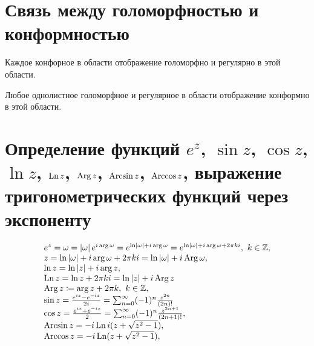 \section{Связь между голоморфностью и конформностью}

\begin{note}
	Каждое конфорное в области отображение голоморфно и регулярно в этой области.

	Любое однолистное голоморфное и регулярное в области отображение конформно в этой области.
\end{note}

\section{Определение функций $e^z$, $\sin z$, $\cos z$, $\ln z$, $\operatorname{Ln} z$, $\operatorname{Arg} z$, $\operatorname{Arcsin} z$, $\operatorname{Arccos} z$, выражение тригонометрических функций через экспоненту}

\[
	\begin{array}{l}
		e^z = \omega = \left\lvert \omega\right\rvert e^{i\arg \omega} = e^{\ln \left\lvert \omega\right\rvert + i\arg \omega} = e^{\ln \left\lvert \omega\right\rvert + i\arg \omega + 2\pi k i}, \ k \in \mathbb{Z}, \\
		z = \ln \left\lvert \omega\right\rvert + i\arg \omega + 2\pi k i = \ln \left\lvert \omega\right\rvert + i \operatorname{Arg} \omega,                                                              \\
		\ln z = \ln \left\lvert z\right\rvert + i\arg z,                                                                                                                  \\
		\operatorname{Ln} z = \ln z + 2\pi k i = \ln \left\lvert z\right\rvert + i\operatorname{Arg} z                                                                                                \\
		\operatorname{Arg} z \coloneq \arg z + 2\pi k, \ k \in \mathbb{Z},                                                                                                    \\
		\sin z = \frac{e^{iz} - e^{-iz}}{2i} = \sum_{n=0}^{\infty}(-1)^{n}\frac{z^{2n}}{(2n)!}                                                          \\
		\cos z = \frac{e^{iz} + e^{-iz}}{2} = \sum_{n=0}^{\infty}(-1)^{n}\frac{z^{2n+1}}{(2n+1)!},                                                      \\
		\operatorname{Arcsin} z = -i \operatorname{Ln} i (z+\sqrt{z^2 - 1}),                                                                                                        \\
		\operatorname{Arccos} z = -i \operatorname{Ln}(z + \sqrt{z^2 -1}),
	\end{array}
\]

